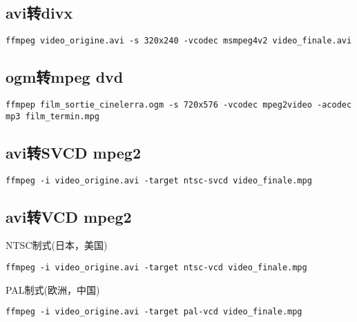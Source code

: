\documentclass[adobefonts]{ctexart}
\begin{document}
\subsection{avi转divx}
\begin{verbatim}
ffmpeg video_origine.avi -s 320x240 -vcodec msmpeg4v2 video_finale.avi
\end{verbatim}

\subsection{ogm转mpeg dvd}
\begin{verbatim}
ffmpep film_sortie_cinelerra.ogm -s 720x576 -vcodec mpeg2video -acodec mp3 film_termin.mpg
\end{verbatim}

\subsection{avi转SVCD mpeg2}
\begin{verbatim}
ffmpeg -i video_origine.avi -target ntsc-svcd video_finale.mpg
\end{verbatim}

\subsection{avi转VCD mpeg2}
NTSC制式(日本，美国)
\begin{verbatim}
ffmpeg -i video_origine.avi -target ntsc-vcd video_finale.mpg
\end{verbatim}

PAL制式(欧洲，中国)
\begin{verbatim}
ffmpeg -i video_origine.avi -target pal-vcd video_finale.mpg
\end{verbatim}

\end{document}

